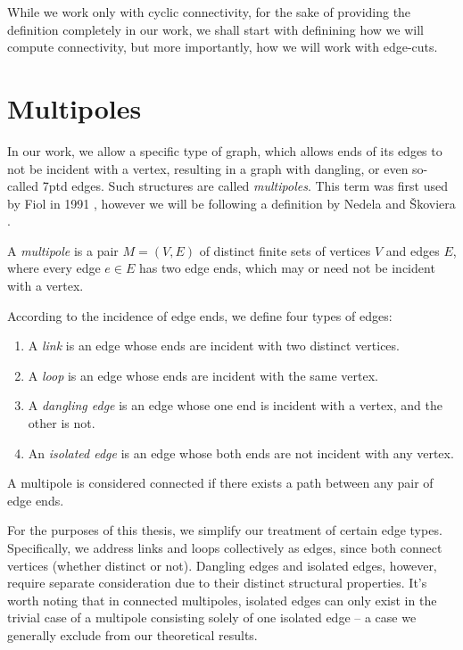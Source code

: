 \documentclass[12pt, twoside]{book}
\begin{document}
While we work only with cyclic connectivity, for the sake of providing the definition completely in our work, we shall start with definining how we will compute connectivity, but more importantly, how we will work with edge-cuts.

\section{Multipoles}\label{sec:multipoles}

In our work, we allow a specific type of graph, which allows ends of its edges to not be incident with a vertex, resulting in a graph with dangling, or even so-called 7ptd edges. Such structures are called \textit{multipoles}. This term was first used by Fiol in 1991 \cite{Fiol1991}, however we will be following a definition by Nedela and Škoviera \cite{Nedela1996}.


\begin{definition}
	A \textit{multipole} is a pair $M=(V,E)$ of distinct finite sets of vertices $V$ and edges $E$, where every edge $e\in E$ has two edge ends, which may or need not be incident with a vertex.
	
	According to the incidence of edge ends, we define four types of edges:
	\begin{enumerate}[nolistsep]
		\item A \textit{link} is an edge whose ends are incident with two distinct vertices.
		\item A \textit{loop} is an edge whose ends are incident with the same vertex.
		\item A \textit{dangling edge} is an edge whose one end is incident with a vertex, and the other is not.
		\item An \textit{isolated edge} is an edge whose both ends are not incident with any vertex.
	\end{enumerate}
\end{definition}

A multipole is considered connected if there exists a path between any pair of edge ends.

For the purposes of this thesis, we simplify our treatment of certain edge types. Specifically, we address links and loops collectively as edges, since both connect vertices (whether distinct or not). Dangling edges and isolated edges, however, require separate consideration due to their distinct structural properties. It's worth noting that in connected multipoles, isolated edges can only exist in the trivial case of a multipole consisting solely of one isolated edge -- a case we generally exclude from our theoretical results.
\end{document}
